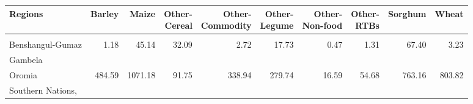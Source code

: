 \begin{table}[!h]
\centering\begingroup\fontsize{7}{9}\selectfont

\begin{tabular}{>{\raggedright\arraybackslash}p{1.8cm}rrrrrrrrr}
\toprule
Regions & Barley & Maize & \makecell{Other-\\Cereal} & \makecell{Other-\\Commodity} & \makecell{Other-\\Legume} & \makecell{Other-\\Non-food} & \makecell{Other-\\RTBs} & Sorghum & Wheat\\
\midrule
\cellcolor{gray!10}{Amhara} & \cellcolor{gray!10}{359.74} & \cellcolor{gray!10}{426.54} & \cellcolor{gray!10}{199.97} & \cellcolor{gray!10}{8.31} & \cellcolor{gray!10}{233.79} & \cellcolor{gray!10}{32.16} & \cellcolor{gray!10}{26.94} & \cellcolor{gray!10}{608.07} & \cellcolor{gray!10}{499.49}\\
Benshangul-Gumaz & 1.18 & 45.14 & 32.09 & 2.72 & 17.73 & 0.47 & 1.31 & 67.40 & 3.23\\
Gambela
\cellcolor{gray!10}{Peoples} & \cellcolor{gray!10}{0.05} & \cellcolor{gray!10}{5.62} & \cellcolor{gray!10}{0.05} & \cellcolor{gray!10}{3.47} & \cellcolor{gray!10}{0.18} & \cellcolor{gray!10}{0.28} & \cellcolor{gray!10}{0.24} & \cellcolor{gray!10}{4.67} & \cellcolor{gray!10}{0.02}\\
Oromia & 484.59 & 1071.18 & 91.75 & 338.94 & 279.74 & 16.59 & 54.68 & 763.16 & 803.82\\
Southern
Nations,
\cellcolor{gray!10}{Nationalities} & \cellcolor{gray!10}{92.72} & \cellcolor{gray!10}{277.53} & \cellcolor{gray!10}{5.50} & \cellcolor{gray!10}{117.43} & \cellcolor{gray!10}{88.85} & \cellcolor{gray!10}{54.53} & \cellcolor{gray!10}{38.53} & \cellcolor{gray!10}{118.07} & \cellcolor{gray!10}{139.81}\\
\bottomrule
\end{tabular}
\endgroup{}
\end{table}
